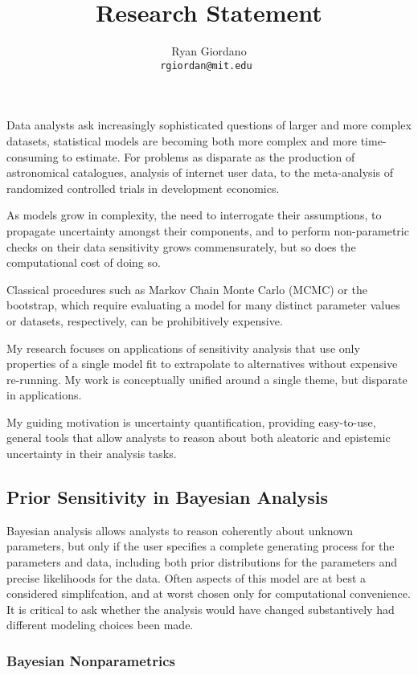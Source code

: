

\title{Research Statement}

\author{
  Ryan Giordano \\ \texttt{rgiordan@mit.edu }
}



Data analysts ask increasingly sophisticated questions of larger and more
complex datasets, statistical models are becoming both more complex and more
time-consuming to estimate.   For problems as disparate as the production of
astronomical catalogues, analysis of internet user data, to the meta-analysis of
randomized controlled trials in development economics.

As models grow in complexity, the need to interrogate their assumptions,
to propagate uncertainty amongst their components, and to perform non-parametric
checks on their data sensitivity grows commensurately, but so does the
computational cost of doing so.

Classical procedures such as Markov Chain Monte Carlo (MCMC) or the bootstrap,
which require evaluating a model for many distinct parameter values or datasets,
respectively, can be prohibitively expensive.

My research focuses on applications of sensitivity analysis that use only
properties of a single model fit to extrapolate to alternatives without
expensive re-running.  My work is conceptually unified around a single theme,
but disparate in applications.

My guiding motivation is uncertainty quantification, providing easy-to-use,
general tools that allow analysts to reason about both aleatoric and epistemic
uncertainty in their analysis tasks.


\subsection*{Prior Sensitivity in Bayesian Analysis}

Bayesian analysis allows analysts to reason coherently about unknown parameters,
but only if the user specifies a complete generating process for the parameters
and data, including both prior distributions for the parameters and precise
likelihoods for the data.  Often aspects of this model are at best a considered
simplifcation, and at worst chosen only for computational convenience.  It is
critical to ask whether the analysis would have changed substantively had
different modeling choices been made.

\subsubsection*{Bayesian Nonparametrics}


